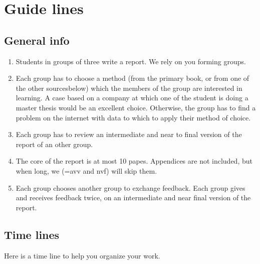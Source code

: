 \documentclass[report]{subfiles}
\begin{document}
\section*{Guide lines}
\label{sec:time-line}

\subsection*{General info}
\label{sec:general}


\begin{enumerate}
\item  Students in groups of three write a report. We rely on you forming groups.
\item Each group has to choose a method (from the primary book, or from one of the other sourcesbelow) which the members of the group are interested in learning. A case based on a company at which one of the student is doing a master thesis would be an excellent choice.
Otherwise, the group has to find a problem on the internet with data to which to apply their method of choice.
\item Each group has to review an intermediate and near to final version of the report of an other group.
\item The core of the report is at most 10 papes. Appendices are not included, but when long, we (=avv and nvf) will skip them.
\item Each group chooses another group to exchange feedback.
  Each group gives and receives feedback twice, on an intermediate and near final version of the report.
\end{enumerate}

\subsection*{Time lines}


Here is a time line to help you organize your work.
\end{document}
